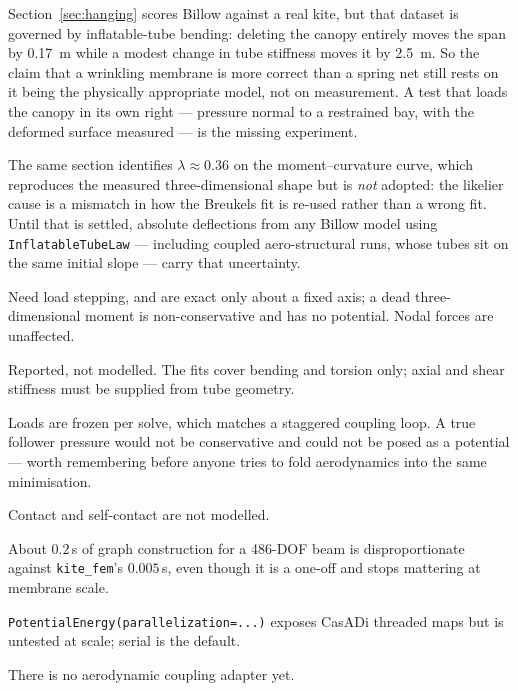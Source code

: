 \documentclass[11pt,a4paper]{article}
\newcommand{\code}[1]{\texttt{\small #1}}
\begin{document}
\begin{description}[style=unboxed,leftmargin=1.2em]
\item[The measured validation cannot decide the canopy.]
Section~\ref{sec:hanging} scores Billow against a real kite, but that dataset
is governed by inflatable-tube bending: deleting the canopy entirely moves the
span by \SI{0.17}{m} while a modest change in tube stiffness moves it by
\SI{2.5}{m}. So the claim that a wrinkling membrane is more correct than a
spring net still rests on it being the physically appropriate model, not on
measurement. A test that loads the canopy in its own right --- pressure normal
to a restrained bay, with the deformed surface measured --- is the missing
experiment.

\item[Tube stiffness is unresolved at roughly a factor of three.] The same
section identifies $\lambda \approx 0.36$ on the moment--curvature curve, which
reproduces the measured three-dimensional shape but is \emph{not} adopted: the
likelier cause is a mismatch in how the Breukels fit is re-used rather than a
wrong fit. Until that is settled, absolute deflections from any Billow model
using \code{InflatableTubeLaw} --- including coupled aero-structural runs, whose
tubes sit on the same initial slope --- carry that uncertainty.

\item[Applied moments.] Need load stepping, and are exact only about a fixed
axis; a dead three-dimensional moment is non-conservative and has no potential.
Nodal forces are unaffected.

\item[Post-collapse tubes.] Reported, not modelled. The fits cover bending and
torsion only; axial and shear stiffness must be supplied from tube geometry.

\item[Dead loads.] Loads are frozen per solve, which matches a staggered
coupling loop. A true follower pressure would not be conservative and could not
be posed as a potential --- worth remembering before anyone tries to fold
aerodynamics into the same minimisation.

\item[No contact.] Contact and self-contact are not modelled.

\item[Setup cost.] About $0.2$\,s of graph construction for a 486-DOF beam is
disproportionate against \code{kite\_fem}'s $0.005$\,s, even though it is a
one-off and stops mattering at membrane scale.

\item[Threaded assembly.] \code{PotentialEnergy(parallelization=...)} exposes
CasADi threaded maps but is untested at scale; serial is the default.

\item[Not coupled.] There is no aerodynamic coupling adapter yet.
\end{description}
\end{document}
